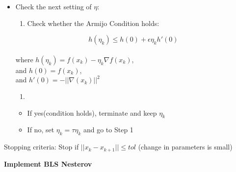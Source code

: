 \documentclass[
  letterpaper,
  DIV=11,
  numbers=noendperiod]{scrartcl}
\providecommand{\tightlist}{%
  \setlength{\itemsep}{0pt}\setlength{\parskip}{0pt}}\usepackage{longtable,booktabs,array}
\begin{document}
\begin{itemize}
\tightlist
\item
  Check the next setting of \(\eta\):

  \begin{enumerate}
  \def\labelenumi{\arabic{enumi}.}
  \tightlist
  \item
    Check whether the Armijo Condition holds:
  \end{enumerate}

  \[
  h(η_k) ≤ h(0) + ϵη_kh'(0)
  \]\\
  where \(h(η_k) = f(x_k) − η_k ∇f(x_k)\),\\
  and \(h(0) = f(x_k)\),\\
  and \(h'(0) = -||\nabla (x_k)||^2\)

  \begin{enumerate}
  \def\labelenumi{\arabic{enumi}.}
  \setcounter{enumi}{1}
  \tightlist
  \item
  \end{enumerate}

  \begin{itemize}
  \tightlist
  \item
    If yes(condition holds), terminate and keep \(η_k\)
  \item
    If no, set \(η_k = τη_k\) and go to Step 1
  \end{itemize}
\end{itemize}

Stopping criteria: Stop if \(||x_k - x_{k+1}|| ≤ tol\) (change in
parameters is small)

\textbf{Implement BLS Nesterov}
\end{document}
